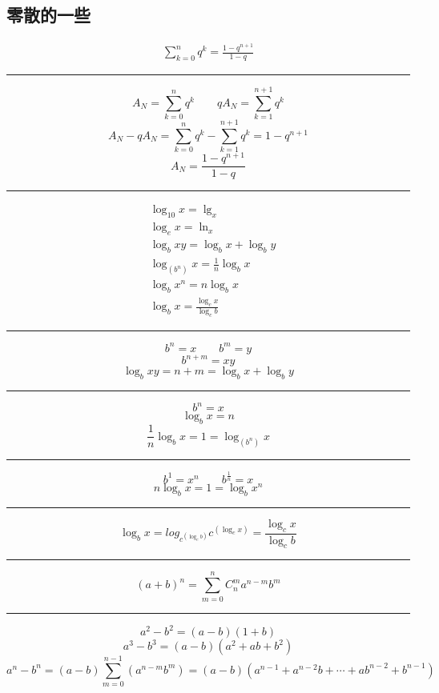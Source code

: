 \begin{center}\section{ 零散的一些}\end{center}
\begin{align}
\sum\limits_{k=0}^{n}q^k = \frac{1-q^{n+1}}{1-q}
\end{align}
\noindent\rule{\textwidth}{0.4pt}
$$A_N = \sum\limits_{k = 0}^{n}q^k \qquad qA_N = \sum\limits_{k = 1}^{n+1}q^k$$
$$A_N - qA_N = \sum\limits_{k = 0}^{n}q^k -\sum\limits_{k=1}^{n+1}q^k = 1-q^{n+1}$$
$$A_N = \frac{1-q^{n+1}}{1-q}$$
\noindent\rule{\textwidth}{0.4pt}

\begin{align}
&\log_{10}{x} = \lg_{x} \\
&\log_{e}{x} = \ln_{x}\\
&\log_{b}{xy} = \log_{b}{x} + \log_{b}{y}\\
&\log_{\left(b^n\right)}{x} = \frac{1}{n}\log_{b}{x} \\
&\log_{b}{x^n} = n\log_{b}{x} \\
&\log_{b}{x} = \frac{\log_{c}{x}}{\log_{c}{b}}
\end{align}
\noindent\rule{\textwidth}{0.4pt}
$$b^n = x\qquad b^m =y$$
$$b^{n+m} = xy$$
$$\log_{b}{xy} = n + m = \log_{b}{x} + \log_{b}{y}$$
\noindent\rule{\textwidth}{0.4pt}
$$b^n = x$$
$$\log_{b}{x} = n$$
$$\frac{1}{n}\log_{b}{x}= 1 = \log_{\left(b^n\right)}{x}$$
\noindent\rule[\fill]{\textwidth}{0.4pt}
$$b^1 = x^n \qquad b^{\frac{1}{n}} = x$$
$$n\log_{b}{x} = 1 = \log_{b}{x^n}$$
\noindent\rule[\fill]{\textwidth}{0.4pt}
$$\log_{b}{x} = log_{c^{\left(\log_{c}{b}\right)}}{c^{\left(\log_{c}{x}\right)}}=\frac{\log_{c}{x}}{\log_{c}{b}}$$
\noindent\rule[\fill]{\textwidth}{0.4pt}
$$\left(a+b\right)^n=\sum_{m = 0}^{n} C_n^m a^{n-m}b^m $$
\noindent\rule[\fill]{\textwidth}{0.4pt}
$$a^2-b^2=\left(a-b\right)\left(1+b\right)$$
$$a^3-b^3=\left(a-b\right)\left(a^2+ab+b^2\right)$$
$$a^n-b^n=\left(a-b\right)\sum_{m=0}^{n-1}\left(a^{n-m}b^{m}\right)=\left(a-b\right)\left(a^{n-1}+a^{n-2}b+\cdots+ab^{n-2}+b^{n-1}\right)$$